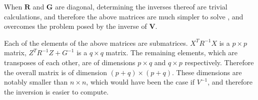 \documentclass[12pt, a4paper]{report}
\begin{document}
When $\textbf{R}$ and $\textbf{G}$  are diagonal, determining the
inverses thereof are trivial calculations, and therefore the above
matrices are much simpler to solve , and overcomes the problem
posed by the inverse of \textbf{V}.

Each of the elements of the above matrices are submatrices.
$X^{T}R^{-1}X$ is a $p \times p$ matrix, $Z^{T}R^{-1}Z + G^{-1}$
is a $q \times q$ matrix. The remaining elements, which are
transposes of each other, are of dimensions $p \times q$ and $q
\times p$ respectively. Therefore the overall matrix is of
dimension $(p+q) \times (p+q)$. These dimensions are notably
smaller than $n \times n$, which would have been the case if
$V^{-1}$, and therefore the inversion is easier to compute.








\end{document}
